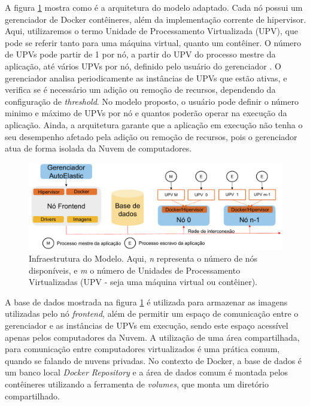 \documentclass[twoside,english,brazilian]{UNISINOSartigo}
\begin{document}
A figura \ref{fig:arquitetura} mostra como é a arquitetura do modelo adaptado. Cada nó possui um gerenciador de Docker contêineres, além da implementação corrente de hipervisor. Aqui, utilizaremos o termo Unidade de Processamento Virtualizada (UPV), que pode se referir tanto para uma máquina virtual, quanto um contêiner. O número de UPVs pode partir de 1 por nó, a partir do UPV do processo mestre da aplicação, até vários UPVs por nó, definido pelo usuário do gerenciador \cite{6307065}. O gerenciador analisa periodicamente as instâncias de UPVs que estão ativas, e verifica se é necessário um adição ou remoção de recursos, dependendo da configuração de \textit{threshold}. No modelo proposto, o usuário pode definir o número minimo e máximo de UPVs por nó e quantos poderão operar na execução da aplicação. Ainda, a arquitetura garante que a aplicação em execução não tenha o seu desempenho afetado pela adição ou remoção de recursos, pois o gerenciador atua de forma isolada da Nuvem de computadores. 
\begin{figure}[ht!]
	\caption{Infraestrutura do Modelo. Aqui, \textit{n} representa o número de nós disponíveis, e \textit{m} o número de Unidades de Processamento Virtualizadas (UPV - seja uma máquina virtual ou contêiner).}
	\label{fig:arquitetura}
	\centering%
	\vspace{-0.5\baselineskip}
	\begin{minipage}{0.8\textwidth}
		\includegraphics[width=\textwidth]{images/arquitetura}
	\end{minipage}
\end{figure}
A base de dados mostrada na figura \ref{fig:arquitetura} é utilizada para armazenar as imagens utilizadas pelo nó \textit{frontend}, além de permitir um espaço de comunicação entre o gerenciador e as instâncias de UPVs em execução, sendo este espaço acessível apenas pelos computadores da Nuvem. A utilização de uma área compartilhada, para comunicação entre computadores virtualizados é uma prática comum, quando se falando de nuvens privadas. No contexto de Docker, a base de dados é um banco local \textit{Docker Repository} e a área de dados comum é montada pelos contêineres utilizando a ferramenta de \textit{volumes}, que monta um diretório compartilhado.
\end{document}
